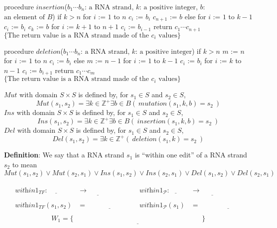 \documentclass[12pt, oneside]{article}
\begin{document}
\begin{algorithm}
procedure $\textit{insertion}$($b_1\cdots b_n$: $\textrm{a RNA strand}$, $k$: $\textrm{a  positive integer}$, $b$: $\textrm{an  element of } B$)
if $k > n$
  for $i$ := $1$ to $n$
    $c_i$ := $b_i$
  $c_{n+1}$ := $b$
else 
  for $i$ := $1$ to $k-1$
    $c_i$ := $b_i$
  $c_k$ := $b$
  for $i$ := $k+1$ to $n+1$
    $c_i$ := $b_{i-1}$
return $c_1\cdots c_{n+1}$ $\{ \textrm{The return value is a RNA strand made of the } c_i \textrm{ values}\}$
\end{algorithm}

\begin{algorithm}
procedure $\textit{deletion}$($b_1\cdots b_n$: $\textrm{a RNA strand}$, $k$: $\textrm{a  positive integer}$)
if $k > n$
  $m$ := $n$
  for $i$ := $1$ to $n$
    $c_i$ := $b_i$
else
  $m$ := $n-1$
  for $i$ := $1$ to $k-1$ 
    $c_i$ := $b_i$
  for $i$ := $k$ to $n-1$
    $c_i$ := $b_{i+1}$
return $c_1\cdots c_m$ $\{ \textrm{The return value is a RNA strand made of the } c_i \textrm{ values}\}$
\end{algorithm}


$Mut$ with domain $S \times S$ is defined by, for $s_1 \in S$ and $s_2 \in S$,
\[
Mut(s_1,s_2) = \exists k\in \mathbb{Z^+} \exists b \in B (~ mutation(s_1, k, b) = s_2~)
\]
$Ins$ with domain $S \times S$ is defined by, for $s_1 \in S$ and $s_2 \in S$,
\[
Ins(s_1,s_2) = \exists k\in \mathbb{Z^+} \exists b \in B (~ insertion(s_1, k, b) = s_2~)
\]
$Del$ with domain $S \times S$ is defined by, for $s_1 \in S$ and $s_2 \in S$,
\[
Del(s_1,s_2) = \exists k\in \mathbb{Z^+} (~ deletion(s_1, k) = s_2~)
\]

{\bf Definition}: We say that a RNA strand $s_1$ is ``within one edit'' of a RNA strand $s_2$ to mean
\[
Mut(s_1,s_2) \lor Mut(s_2,s_1) \lor Ins(s_1,s_2) \lor Ins(s_2, s_1) \lor Del(s_1, s_2) \lor Del(s_2,s_1)
\]

\[
\begin{array}{ll}
    \begin{array}{lll}
    & \textit{within1}_{TF} : \underline{\phantom{S \times S}} & \to \underline{\phantom{\{T, F\}}} \\
    \\
    & \textit{within1}_{TF}(s_1, s_2) & = \underline{\phantom{\textrm{``CHECK if within 1 edit''}}} \\
    \end{array}
&


    \begin{array}{lll}
    & \textit{within1}_{\mathcal{P}} : \underline{\phantom{S \hspace{1em}}} & \to \underline{\phantom{\mathcal{P}(S)}} \\
    \\
    & \textit{within1}_{\mathcal{P}}(s_1) & = \underline{\phantom{\textrm{``COMPUTE all within 1 edit''}}} \\
    \end{array}
\end{array}
\]
\[
W_1 = \{ \underline{\phantom{(s_1, s_2) \in S \times S ~\mid~ s_1, s_2 \textrm{ are within 1 edit}}}\}
\]
\end{document}
